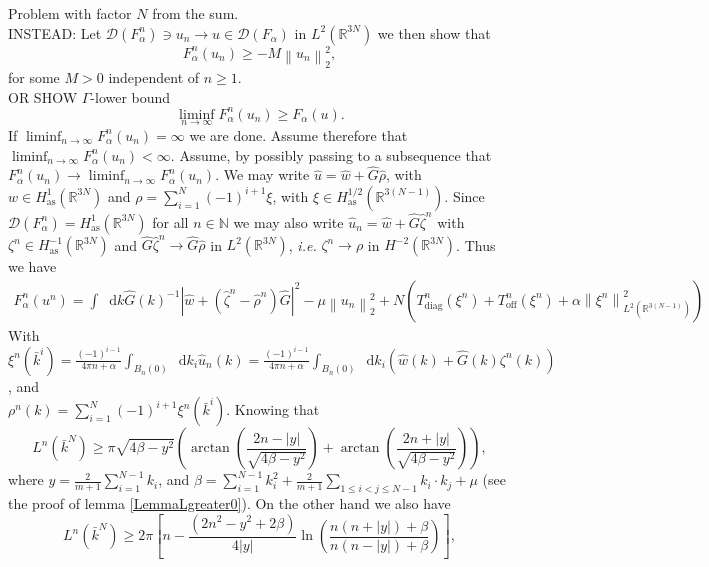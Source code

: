 \documentclass[a4paper,11pt]{article}
\newcommand{\norm}[1]{\left\lVert #1 \right\rVert}
\newcommand{\abs}[1]{\left\lvert #1 \right\rvert}
\newcommand{\dom}[1]{\mathscr D\left(#1\right)}
\newcommand*\diff{\mathop{}\!\mathrm{d}}
\newcommand{\ie}{\emph{i.e.} }
\newcommand{\R}{\mathbb{R}}
\numberwithin{equation}{section}
\begin{document}
Problem with factor $ N $ from the sum.\vspace{0.5cm}\\
INSTEAD: Let $ \dom{F^n_\alpha}\ni u_n\to u\in\dom{F_\alpha} $ in $ L^2(\R^{3N}) $ we then show that \begin{equation}
F_\alpha^n(u_n)\geq-M\norm{u_n}_2^2,
\end{equation}
for some $ M>0 $ independent of $ n\geq1 $.
\vspace{0.5cm}\\
OR SHOW $ \Gamma $-lower bound\begin{equation}
\liminf_{n\to\infty}F^n_\alpha(u_n)\geq F_\alpha(u).
\end{equation}
If $ \liminf_{n\to\infty}F_\alpha^n(u_n)=\infty $ we are done. Assume therefore that $ \liminf_{n\to\infty}F_\alpha^n(u_n)<\infty $.
Assume, by possibly passing to a subsequence that $ F_\alpha^n(u_n)\to\liminf_{n\to\infty}F_\alpha^n(u_n) $. We may write $ \hat{u}=\hat{w}+\hat{G}\hat{\rho} $, with $ w\in H_\text{as}^1(\R^{3N}) $ and $ \rho=\sum_{i=1}^{N}(-1)^{i+1}\xi $, with $ \xi\in H_{\text{as}}^{1/2}(\R^{3(N-1)}) $. Since $ \dom{F_\alpha^n}=H_{\text{as}}^1(\R^{3N}) $ for all $ n\in\mathbb{N} $ we may also write $ \hat{u}_n=\hat{w}+\hat{G}\hat{\zeta}^n $ with $ \zeta^n\in H_{\text{as}}^{-1}(\R^{3N}) $ and $ \hat{G}\hat{\zeta}^n\to\hat{G}\hat{\rho} $ in $ L^2(\R^{3N}) $, \ie $ \zeta^n\to\rho $ in $ H^{-2}(\R^{3N}) $. Thus we have\begin{equation}
\begin{aligned}
F_\alpha^n(u^n)
=\int\diff k \hat{G}(k)^{-1}\abs{\hat{w}+(\hat{\zeta}^n-\hat{\rho}^n)\hat{G}}^2-\mu\norm{u_n}^2_2+N\left(T^n_{\text{diag}}(\xi^n)+T^n_{\text{off}}(\xi^n)+\alpha\norm{\xi^n}^2_{L^2(\R^{3(N-1)})}\right)
\end{aligned}
\end{equation}
With $ \xi^n(\bar{k}^i)=\frac{(-1)^{i-1}}{4\pi n+\alpha}\int_{B_n(0)}\diff k_i\hat{u}_n(k)=\frac{(-1)^{i-1}}{4\pi n+\alpha}\int_{B_n(0)}\diff k_i \left(\hat{w}(k)+\hat{G}(k)\zeta^n(k)\right) $, and\\ $ \rho^n(k)=\sum_{i=1}^{N}(-1)^{i+1}\xi^n(\bar{k}^i) $. Knowing that \begin{equation}
L^n(\bar{k}^N)\geq\pi\sqrt{4\beta-y^2}\left(\arctan\left(\frac{2n-\abs{y}}{\sqrt{4\beta-y^2}}\right)+\arctan\left(\frac{2n+\abs{y}}{\sqrt{4\beta-y^2}}\right)\right),
\end{equation}
where $ y=\frac{2}{m+1}\sum_{i=1}^{N-1}k_i $, and $ \beta=\sum_{i=1}^{N-1}k_i^2+\frac{2}{m+1}\sum_{1\leq i<j\leq N-1}k_i\cdot k_j+\mu $ (see the proof of lemma \ref{LemmaLgreater0}). On the other hand we also have \begin{equation}
L^n(\bar{k}^N)\geq2\pi\left[n-\frac{(2n^2-y^2+2\beta)}{4\abs{y}}\ln\left(\frac{n(n+\abs{y})+\beta}{n(n-\abs{y})+\beta}\right)\right],
\end{equation}
\end{document}
